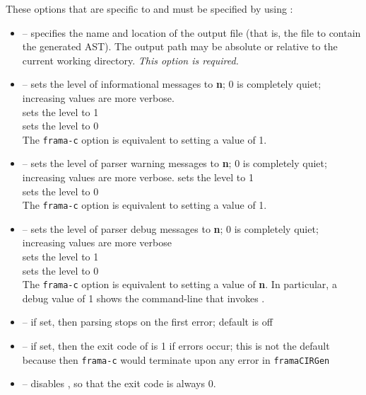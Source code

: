 These options that are specific to \irg and must be specified by using :
\begin{itemize}
	\item {} -- specifies the name and location of the output file (that is, the file to contain the generated AST). The output path may be absolute or relative to the current working directory. \textit{This option is required.}
	\item {} -- sets the level of informational messages to \textbf{n}; 0 is completely quiet; increasing values are
	more verbose. \\
	 sets the level to 1 \\
	 sets the level to 0\\
	 The \lstinline|frama-c| option  is equivalent to setting a value of 1.
	
	\item {} -- sets the level of parser warning messages to \textbf{n}; 0 is completely quiet; increasing values are
more verbose.  sets the level to 1\\
 sets the level to 0\\
The \lstinline|frama-c| option  is equivalent to setting a value of 1.

	\item {} -- sets the level of parser debug messages to \textbf{n}; 0 is completely quiet; increasing values are
more verbose\\
  sets the level to 1\\
 sets the level to 0\\
The \lstinline|frama-c| option  is equivalent to setting a value of \textbf{n}.
In particular, a debug value of 1 shows the command-line that invokes \irg.

	\item {} -- if set, then parsing stops on the first error; default is off
	\item {} -- if set, then the exit code of \irg is 1 if errors occur; this is not the default because then \lstinline|frama-c| would terminate upon
	any error in \lstinline|framaCIRGen|
	\item {} -- disables , so that the exit code is always 0.
	
\end{itemize}

